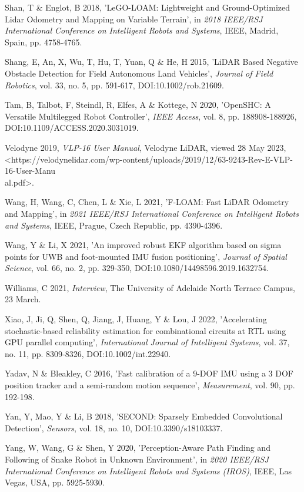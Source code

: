 Shan, T \& Englot, B 2018, 'LeGO-LOAM: Lightweight and Ground-Optimized Lidar Odometry and Mapping on Variable Terrain', in \textit{2018 IEEE/RSJ International Conference on Intelligent Robots and Systems}, IEEE, Madrid, Spain, pp. 4758-4765.

Shang, E, An, X, Wu, T, Hu, T, Yuan, Q \& He, H 2015, 'LiDAR Based Negative Obstacle Detection for Field Autonomous Land Vehicles', \textit{Journal of Field Robotics}, vol. 33, no. 5, pp. 591-617, DOI:10.1002/rob.21609.

Tam, B, Talbot, F, Steindl, R, Elfes, A \& Kottege, N 2020, 'OpenSHC: A Versatile Multilegged Robot Controller', \textit{IEEE Access}, vol. 8, pp. 188908-188926, DOI:10.1109/ACCESS.2020.3031019.

Velodyne 2019, \textit{VLP-16 User Manual}, Velodyne LiDAR, viewed 28 May 2023, \\ \textless https://velodynelidar.com/wp-content/uploads/2019/12/63-9243-Rev-E-VLP-16-User-Manu\\al.pdf\textgreater.

Wang, H, Wang, C, Chen, L \& Xie, L 2021, 'F-LOAM: Fast LiDAR Odometry and Mapping', in \textit{2021 IEEE/RSJ International Conference on Intelligent Robots and Systems}, IEEE, Prague, Czech Republic, pp. 4390-4396.

Wang, Y \& Li, X 2021, 'An improved robust EKF algorithm based on sigma points for UWB and foot-mounted IMU fusion positioning', \textit{Journal of Spatial Science}, vol. 66, no. 2, pp. 329-350, DOI:10.1080/14498596.2019.1632754.

Williams, C 2021, \textit{Interview}, The University of Adelaide North Terrace Campus, 23 March.

Xiao, J, Ji, Q, Shen, Q, Jiang, J, Huang, Y \& Lou, J 2022, 'Accelerating stochastic-based reliability estimation for combinational circuits at RTL using GPU parallel computing', \textit{International Journal of Intelligent Systems}, vol. 37, no. 11, pp. 8309-8326, DOI:10.1002/int.22940.

Yadav, N \& Bleakley, C 2016, 'Fast calibration of a 9-DOF IMU using a 3 DOF position tracker and a semi-random motion sequence', \textit{Measurement}, vol. 90, pp. 192-198.

Yan, Y, Mao, Y \& Li, B 2018, 'SECOND: Sparsely Embedded Convolutional Detection', \textit{Sensors}, vol. 18, no. 10, DOI:10.3390/s18103337.

Yang, W, Wang, G \& Shen, Y 2020, 'Perception-Aware Path Finding and Following of Snake Robot in Unknown Environment', in \textit{2020 IEEE/RSJ International Conference on Intelligent Robots and Systems (IROS)}, IEEE, Las Vegas, USA, pp. 5925-5930.

